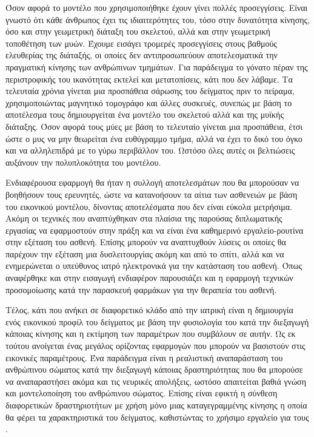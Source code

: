 Όσον αφορά το μοντέλο που χρησιμοποιήθηκε έχουν γίνει πολλές προσεγγίσεις. Είναι γνωστό ότι κάθε άνθρωπος έχει τις ιδιαιτερότητες του, τόσο στην δυνατότητα κίνησης, όσο και στην γεωμετρική διάταξη του σκελετού, αλλά και στην γεωμετρική τοποθέτηση των μυών. Έχουμε εισάγει τρομερές προσεγγίσεις στους βαθμούς ελευθερίας της διάταξής, οι οποίες δεν αντιπροσωπεύουν αποτελεσματικά την πραγματική κίνησης των ανθρώπινων τμημάτων. Για παράδειγμα το γόνατο πέραν της περιστροφικής του ικανότητας εκτελεί και μετατοπίσεις, κάτι που δεν λάβαμε. Τα τελευταία χρόνια γίνεται μια προσπάθεια σάρωσης του δείγματος πριν το πείραμα, χρησιμοποιώντας μαγνητικό τομογράφο και άλλες συσκευές, συνεπώς με βάση το αποτέλεσμα τους δημιουργείται ένα μοντέλο του σκελετού αλλά και της μυϊκής διάταξης. Όσον αφορά τους μύες με βάση το τελευταίο γίνεται μια προσπάθεια, έτσι ώστε ο μυς να μην θεωρείται ένα ευθύγραμμο τμήμα, αλλά να έχει το δικό του όγκο και να αλληλεπιδρά με το γύρω περιβάλλον του. Ωστόσο όλες αυτές οι βελτιώσεις αυξάνουν την πολυπλοκότητα του μοντέλου.

Ενδιαφέρουσα εφαρμογή θα ήταν η συλλογή αποτελεσμάτων που θα μπορούσαν να βοηθήσουν τους ερευνητές, ώστε να κατανοήσουν τα αίτια των ασθενειών με βάση του εικονικού μοντέλου, δίνοντας αποτελέσματα που δεν είναι εύκολα μετρήσιμα. Ακόμη οι τεχνικές που αναπτύχθηκαν στα πλαίσια της παρούσας διπλωματικής εργασίας να εφαρμοστούν στην πράξη και να είναι ένα καθημερινό εργαλείο-ρουτίνα στην εξέταση του ασθενή. Επίσης μπορούν να αναπτυχθούν λύσεις οι οποίες θα παρέχουν την εξέταση μια δυσλειτουργίας ακόμη και από το σπίτι, αλλά και να ενημερώνεται ο υπεύθυνος ιατρό ηλεκτρονικά για την κατάσταση του ασθενή. Όπως αναφέρθηκε και στην εισαγωγή ενδιαφέρον παρουσιάζει και η εφαρμογή τεχνικών προσομοίωσης κατά την παρασκευή φαρμάκων για την θεραπεία του ασθενή.

Τέλος, κάτι που ανήκει σε διαφορετικό κλάδο από την ιατρική είναι η δημιουργία ενός εικονικού προφίλ του δείγματος με βάση την φυσιολογία του κατά την διεξαγωγή κάποιας κίνησης και η εκτίμηση των παραμέτρων που συμβάλουν σε αυτήν. Ως εκ τούτου ανοίγεται ένας μεγάλος ορίζοντας εφαρμογών που μπορούν να βασιστούν στις εικονικές παραμέτρους. Ένα παράδειγμα είναι η ρεαλιστική αναπαράσταση του ανθρώπινου σώματος κατά την διεξαγωγή κάποιας δραστηριότητας που θα μπορούσε να αναπαραστήσει ακόμα και τις νευρικές απολήξεις, ωστόσο απαιτείται βαθιά γνώση και μοντελοποίηση του ανθρώπινου σώματος. Επίσης είναι εφικτή η σύνθεση διαφορετικών δραστηριοτήτων με χρήση μόνο μιας καταγεγραμμένης κίνησης η οποία θα φέρει τα χαρακτηριστικά του δείγματος, καθιστώντας το χρήσιμο εργαλείο για τους .

